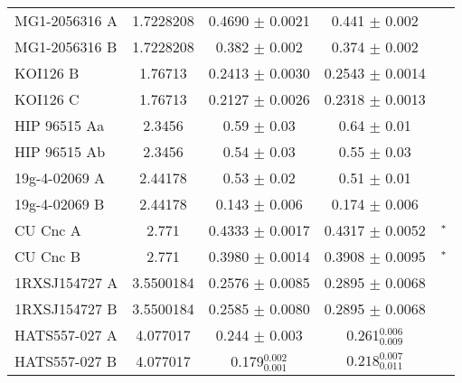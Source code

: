 \documentclass[fleqn,usenatbib]{mnras}
\begin{document}
\begin{table*}
\begin{center}
\begin{tabular}{lcccc}
MG1-2056316 A & 1.7228208 & 0.4690 $\pm$ 0.0021 & 0.441 $\pm$ 0.002 & \cite{Kraus11} \\ %
MG1-2056316 B & 1.7228208 & 0.382 $\pm$ 0.002 & 0.374 $\pm$ 0.002 & \cite{Kraus11} \\ %
KOI126 B & 1.76713 & 0.2413 $\pm$ 0.0030 & 0.2543 $\pm$ 0.0014 & \cite{Carter11} \\ %
KOI126 C & 1.76713 & 0.2127 $\pm$ 0.0026 & 0.2318 $\pm$ 0.0013 & \cite{Carter11} \\ %
HIP 96515 Aa & 2.3456 & 0.59 $\pm$ 0.03 & 0.64 $\pm$ 0.01 & \cite{Huelamo09} \\ %
HIP 96515 Ab & 2.3456 & 0.54 $\pm$ 0.03 & 0.55 $\pm$ 0.03 & \cite{Huelamo09} \\ %
19g-4-02069 A & 2.44178 & 0.53 $\pm$ 0.02 & 0.51 $\pm$ 0.01 & \cite{Nefs13} \\ %
19g-4-02069 B & 2.44178 & 0.143 $\pm$ 0.006 & 0.174 $\pm$ 0.006 & \cite{Nefs13} \\ %
CU Cnc A & 2.771 & 0.4333 $\pm$ 0.0017 & 0.4317 $\pm$ 0.0052 & \cite{Southworth15}$^{\rm *}$ \\ %
CU Cnc B & 2.771 & 0.3980 $\pm$ 0.0014 & 0.3908 $\pm$ 0.0095 & \cite{Southworth15}$^{\rm *}$ \\ %
1RXSJ154727 A & 3.5500184 & 0.2576 $\pm$ 0.0085 & 0.2895 $\pm$ 0.0068 & \cite{Hartman11} \\ %
1RXSJ154727 B & 3.5500184 & 0.2585 $\pm$ 0.0080 & 0.2895 $\pm$ 0.0068 & \cite{Hartman11} \\ %
HATS557-027 A & 4.077017 & 0.244 $\pm$ 0.003 & 0.261$^{0.006}_{0.009}$ & \cite{Zhou15} \\ %
HATS557-027 B & 4.077017 & 0.179$^{0.002}_{0.001}$ & $0.218^{0.007}_{0.011}$ & \cite{Zhou15} \\ %

\end{tabular}
\end{center}
\end{table*}
\end{document}
